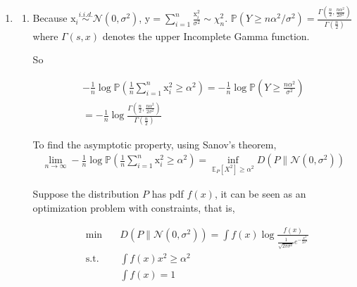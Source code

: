 \documentclass[a4paper]{article}
\begin{document}
\begin{enumerate}
  \setlength{\itemsep}{3\parskip}

\item \begin{enumerate}
\item 

  Because $\mathrm{x}_i \overset{i.i.d.}{\sim} \mathcal{N}(0,\sigma^2)$, $\mathrm{y} = \sum\limits_{i=1}^{n} \frac{\mathrm{x}_i^2}{\sigma^2} \sim \chi^2_{n}$. $\mathbb{P}(Y\geqslant n\alpha^2 /\sigma^2 ) = \frac{\Gamma(\frac{n}{2},\frac{n\alpha^2}{2\sigma^2})}{\Gamma(\frac{n}{2})}$ where $\Gamma(s,x)$ denotes the upper Incomplete Gamma function.

So 

\begin{equation}
  \begin{aligned}
    -\frac{1}{n} \log \mathbb{P}(\frac{1}{n} \sum_{i=1}^n \mathrm{x}_i^2 \geqslant \alpha^2) =  -\frac{1}{n} \log \mathbb{P}(Y\geqslant \frac{n\alpha^2}{\sigma^2}) \\ = -\frac{1}{n} \log \frac{\Gamma(\frac{n}{2},\frac{n\alpha^2}{2\sigma^2})}{\Gamma(\frac{n}{2})}
  \end{aligned}
\end{equation}

To find the asymptotic property, using Sanov's theorem,
\begin{equation}
  \begin{aligned}
    \lim_{n \to \infty}-\frac{1}{n} \log \mathbb{P}(\frac{1}{n} \sum_{i=1}^n \mathrm{x}_i^2 \geqslant \alpha^2) = \inf_{\mathbb{E}_P[X^2] \geqslant \alpha^2} D(P\| \mathcal{N}(0,\sigma^2))
  \end{aligned}
\end{equation}

Suppose the distribution $P$ has pdf $f(x)$, it can be seen as an optimization problem with constraints, that is,

\begin{equation}
  \begin{aligned}
    &\min \quad & D(P\| \mathcal{N}(0,\sigma^2)) = \int f(x) \log{\frac{f(x)}{\frac{1}{\sqrt{2\pi \sigma^2}}e^{-\frac{x^2}{2\sigma^2}}} } \\
    & \text{s.t.} & \int f(x) x^2  \geqslant \alpha^2 \\
    & &\int f(x)= 1
  \end{aligned}
\end{equation}


\end{enumerate}
\end{enumerate}
\end{document}
